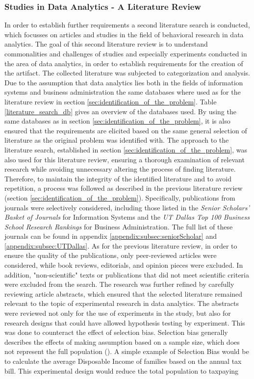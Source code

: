 \subsubsection{Studies in Data Analytics - A Literature Review }\label{subsec:literature_review_requirements}

In order to establish further requirements a second literature search is conducted, which focusses on articles and studies in the field of behavioral research in data analytics. The goal of this second literature review is to understand commonalities and challenges of studies and especially experiments conducted in the area of data analytics, in order to establish requirements for the creation of the artifact. The collected literature was subjected to categorization and analysis. Due to the assumption that data analytics lies both in the fields of information systems and business administration the same databases where used as for the literature review in section \ref{sec:identification_of_the_problem}. Table \ref{literature_search_db} gives an overview of the databases used. By using the same databases as in section \ref{sec:identification_of_the_problem}, it is also ensured that the requirements are elicited based on the same general selection of literature as the original problem was identified with. The approach to the literature search, established in section \ref{sec:identification_of_the_problem}, was also used for this literature review, ensuring a thorough examination of relevant research while avoiding unnecessary altering the process of finding literature. Therefore, to maintain the integrity of the identified literature and to avoid repetition, a process was followed as described in the previous literature review (section \ref{sec:identification_of_the_problem}). Specifically, publications from journals were selectively considered, including those listed in the \textit{Senior Scholars' Basket of Journals} for Information Systems and the \textit{UT Dallas Top 100 Business School Research Rankings} for Business Administration. The full list of these journals can be found in appendix \ref{appendix:subsec:seniorScholar} and \ref{appendix:subsec:UTDallas}. As for the previous literature review, in order to ensure the quality of the publications, only peer-reviewed articles were considered, while book reviews, editorials, and opinion pieces were excluded. In addition, "non-scientific" texts or publications that did not meet scientific criteria were excluded from the search. The research was further refined by carefully reviewing article abstracts, which ensured that the selected literature remained relevant to the topic of experimental research in data analytics. The abstracts were reviewed not only for the use of experiments in the study, but also for research designs that could have allowed hypothesis testing by experiment. This was done to counteract the effect of selection bias. Selection bias generally describes the effects of making assumption based on a sample size, which does not represent the full population (\cite{Heckman.2010}). A simple example of Selection Bias would be to calculate the average Disposable Income of families based on the annual tax bill. This experimental design would reduce the total population to taxpaying 